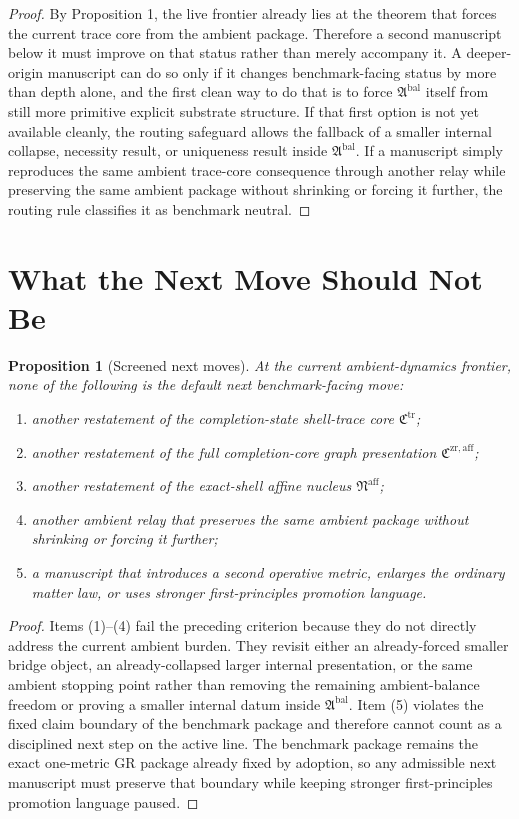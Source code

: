 \documentclass[11pt]{article}
\newcommand{\CompletionCore}{\mathfrak C^{\mathrm{zr,aff}}}
\newcommand{\TraceCore}{\mathfrak C^{\mathrm{tr}}}
\newcommand{\AffineNucleus}{\mathfrak N^{\mathrm{aff}}}
\newcommand{\AmbientPackage}{\mathfrak A^{\mathrm{bal}}}
\newtheorem{proposition}{Proposition}
\begin{document}
\begin{proof}
By Proposition 1, the live frontier already lies at the theorem that forces the current trace core from the ambient package. Therefore a second manuscript below it must improve on that status rather than merely accompany it. A deeper-origin manuscript can do so only if it changes benchmark-facing status by more than depth alone, and the first clean way to do that is to force \(\AmbientPackage\) itself from still more primitive explicit substrate structure. If that first option is not yet available cleanly, the routing safeguard allows the fallback of a smaller internal collapse, necessity result, or uniqueness result inside \(\AmbientPackage\). If a manuscript simply reproduces the same ambient trace-core consequence through another relay while preserving the same ambient package without shrinking or forcing it further, the routing rule classifies it as benchmark neutral.
\end{proof}

\section{What the Next Move Should Not Be}

\begin{proposition}[Screened next moves]
At the current ambient-dynamics frontier, none of the following is the default next benchmark-facing move:
\begin{enumerate}
    \item another restatement of the completion-state shell-trace core \(\TraceCore\);
    \item another restatement of the full completion-core graph presentation \(\CompletionCore\);
    \item another restatement of the exact-shell affine nucleus \(\AffineNucleus\);
    \item another ambient relay that preserves the same ambient package without shrinking or forcing it further;
    \item a manuscript that introduces a second operative metric, enlarges the ordinary matter law, or uses stronger first-principles promotion language.
\end{enumerate}
\end{proposition}

\begin{proof}
Items (1)--(4) fail the preceding criterion because they do not directly address the current ambient burden. They revisit either an already-forced smaller bridge object, an already-collapsed larger internal presentation, or the same ambient stopping point rather than removing the remaining ambient-balance freedom or proving a smaller internal datum inside \(\AmbientPackage\). Item (5) violates the fixed claim boundary of the benchmark package and therefore cannot count as a disciplined next step on the active line. The benchmark package remains the exact one-metric GR package already fixed by adoption, so any admissible next manuscript must preserve that boundary while keeping stronger first-principles promotion language paused.
\end{proof}
\end{document}
